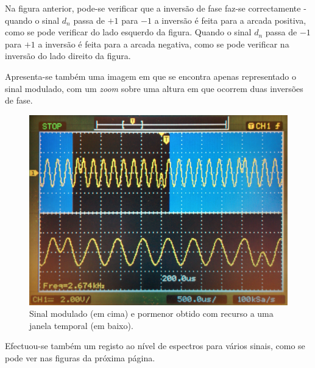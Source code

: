 \documentclass[11pt]{article}
\numberwithin{equation}{section}
\begin{document}
Na figura anterior, pode-se verificar que a inversão de fase faz-se correctamente - quando o sinal $d_n$ passa de $+1$ para $-1$ a inversão é feita para a arcada positiva, como se pode verificar do lado esquerdo da figura. Quando o sinal $d_n$ passa de $-1$ para $+1$ a inversão é feita para a arcada negativa, como se pode verificar na inversão do lado direito da figura.

Apresenta-se também uma imagem em que se encontra apenas representado o sinal modulado, com um \textit{zoom} sobre uma altura em que ocorrem duas inversões de fase. 

\begin{figure}[H]
	\centering
	\includegraphics[keepaspectratio=true, scale=0.10]{exps/BPSK_modulated}
	\caption{Sinal modulado (em cima) e pormenor obtido com recurso a uma janela temporal (em baixo).}
	\vspace{-0.8em}
\end{figure}

Efectuou-se também um registo ao nível de espectros para vários sinais, como se pode ver nas figuras da próxima página.
\end{document}
